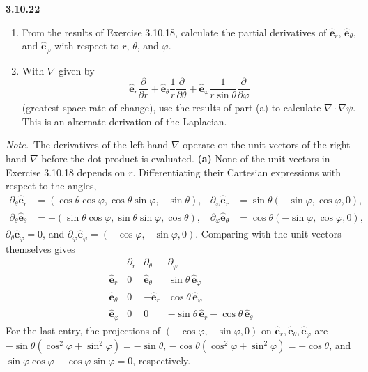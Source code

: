 \par\bigskip
\noindent\textbf{3.10.22}\quad
\begin{enumerate}
\item[(a)] From the results of Exercise 3.10.18, calculate the partial
  derivatives of $\hat{\mathbf{e}}_{r}$, $\hat{\mathbf{e}}_{\theta}$, and
  $\hat{\mathbf{e}}_{\varphi}$ with respect to $r$, $\theta$, and $\varphi$.
\item[(b)] With $\nabla$ given by
  \[
  \hat{\mathbf{e}}_{r}\frac{\partial}{\partial r}
  +\hat{\mathbf{e}}_{\theta}\frac{1}{r}\frac{\partial}{\partial\theta}
  +\hat{\mathbf{e}}_{\varphi}\frac{1}{r\sin\theta}\frac{\partial}
  {\partial\varphi}
  \]
  (greatest space rate of change), use the results of part (a) to calculate
  $\nabla\cdot\nabla\psi$. This is an alternate derivation of the Laplacian.
\end{enumerate}
\emph{Note.}~The derivatives of the left-hand $\nabla$ operate on the unit
vectors of the right-hand $\nabla$ before the dot product is evaluated.
\solution
\textbf{(a)} None of the unit vectors in Exercise 3.10.18 depends on $r$.
Differentiating their Cartesian expressions with respect to the angles,
\[
\begin{aligned}
\partial_\theta\hat{\mathbf e}_r&=(\cos\theta\cos\varphi,\cos\theta\sin\varphi,-\sin\theta),&
\partial_\varphi\hat{\mathbf e}_r&=\sin\theta(-\sin\varphi,\cos\varphi,0),\\
\partial_\theta\hat{\mathbf e}_\theta&=-(\sin\theta\cos\varphi,\sin\theta\sin\varphi,\cos\theta),&
\partial_\varphi\hat{\mathbf e}_\theta&=\cos\theta(-\sin\varphi,\cos\varphi,0),
\end{aligned}
\]
$\partial_\theta\hat{\mathbf e}_\varphi=0$, and
$\partial_\varphi\hat{\mathbf e}_\varphi=(-\cos\varphi,-\sin\varphi,0)$.
Comparing with the unit vectors themselves gives
\[
\begin{array}{c|ccc}
&\partial_r&\partial_\theta&\partial_\varphi\\\hline
\hat{\mathbf e}_r&0&\hat{\mathbf e}_\theta&\sin\theta\,\hat{\mathbf e}_\varphi\\
\hat{\mathbf e}_\theta&0&-\hat{\mathbf e}_r&\cos\theta\,\hat{\mathbf e}_\varphi\\
\hat{\mathbf e}_\varphi&0&0&-\sin\theta\,\hat{\mathbf e}_r-\cos\theta\,\hat{\mathbf e}_\theta
\end{array}
\]
For the last entry, the projections of
$(-\cos\varphi,-\sin\varphi,0)$ on $\hat{\mathbf e}_r,\hat{\mathbf e}_\theta,
\hat{\mathbf e}_\varphi$ are
$-\sin\theta(\cos^2\varphi+\sin^2\varphi)=-\sin\theta$,
$-\cos\theta(\cos^2\varphi+\sin^2\varphi)=-\cos\theta$, and
$\sin\varphi\cos\varphi-\cos\varphi\sin\varphi=0$, respectively.

